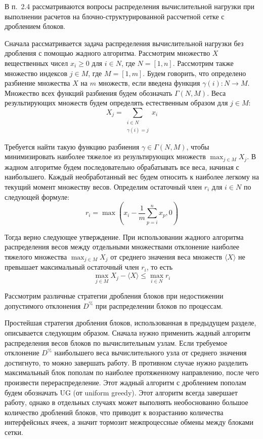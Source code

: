 \documentclass[a4paper,14pt]{extarticle}                     %
\theoremstyle{plain}                                         %
\begin{document}

В п.~2.4 рассматриваются вопросы распределения вычислительной нагрузки при выполнении расчетов на блочно-структурированной рассчетной сетке с дроблением блоков.

Сначала рассматривается задача распределения вычислительной нагрузки без дробления с помощью жадного алгоритма.
Рассмотрим множество $X$ вещественных чисел $x_i \ge 0$ для $i \in N$, где $N = [1, n]$.
Рассмотрим также множество индексов $j \in M$, где $M = [1, m]$.
Будем говорить, что определено разбиение множества $X$ на $m$ множеств, если введена функция $\gamma(i): N \rightarrow M$.
Множество всех функций разбиения будем обозначать $\Gamma(N, M)$.
Веса результирующих множеств будем определять естественным образом для $j \in M$:
\begin{equation}
	X_j = \sum_{\substack{i \in N \\ \gamma(i) = j}}{x_i}
\end{equation}

Требуется найти такую функцию разбиения $\gamma \in \Gamma(N, M)$, чтобы минимизировать наиболее тяжелое из результирующих множеств $\max_{j \in M}{X_j}$.
В жадном алгоритме будем последовательно обрабатывать все веса, начиная с наибольшего.
Каждый необработанный вес будем относить к наиболее легкому на текущий момент множеству весов.
Определим остаточный член $r_i$ для $i \in N$ по следующей формуле:
\begin{equation}
	r_i = \max{\left( x_i - \frac{1}{m} \sum_{p = i}^{n}{x_p}, 0 \right)}
\end{equation}

Тогда верно следующее утверждение.
При использовании жадного алгоритма распределения весов между отдельными множествами отклонение наиболее тяжелого множества $\max_{j \in M}{X_j}$ от среднего значения веса множеств $\langle X \rangle$ не превышает максимальный остаточный член $r_i$, то есть
\begin{equation}
	\max_{j \in M}{X_j} - \langle X \rangle \le \max_{i \in N}{r_i}
\end{equation}

Рассмотрим различные стратегии дробления блоков при недостижении допустимого отклонения $D^{\%}$ при распределении блоков по процессам.

Простейшая стратегия дробления блоков, использованная в предыдущем разделе, описывается следующим образом.
Сначала нужно применить жадный алгоритм распределения весов блоков по вычислительным узлам.
Если требуемое отклонение $D^{\%}$ наибольшего веса вычислительного узла от среднего значения достигнуто, то можно завершать работу.
В противном случае нужно разделить максимальный блок пополам по наиболее протяженному направлению, после чего произвести перераспределение.
Этот жадный алгоритм с дроблением пополам будем обозначать UG (от uniform greedy).
Этот алгоритм всегда завершает работу, однако в отдельных случаях может выполнять необоснованно большое количество дроблений блоков, что приводит к возрастанию количества интерфейсных ячеек, а значит тормозит межпроцессные обмены между блоками сетки.
\end{document}
